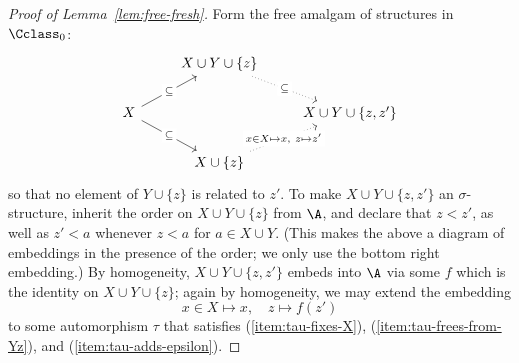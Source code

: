 \begin{proof}[Proof of Lemma~\ref{lem:free-fresh}]
    Form the free amalgam of structures in ${\Cclass}_0$:
\[\begin{tikzcd}
	& {X \cup Y \cup \{z\}} & \\
	X && {X \cup Y \cup \{z, z'\}} \\
	& {X \cup \{z\}}
	\arrow["\subseteq"{description}, dotted, from=1-2, to=2-3]
	\arrow["\subseteq"{description}, from=2-1, to=1-2]
	\arrow["\subseteq"{description}, from=2-1, to=3-2]
	\arrow["{x \in X \mapsto x,\ z \mapsto z'}"{description}, dotted, from=3-2, to=2-3]
\end{tikzcd}\]
    so that no element of $Y \cup \{z\}$ is related to $z'$.
    To make $X \cup Y \cup \{z, z'\}$ an $\sigma$-structure, 
    inherit the order on $X \cup Y \cup \{z\}$ from $\A$,
    and declare that $z < z'$, as well as $z' < a$ whenever $z<a$ for $a\in X \cup Y$. (This makes the above a diagram of embeddings in the presence of the order; we only use the bottom right embedding.)
    By homogeneity, $X \cup Y \cup \{z, z'\}$ embeds into $\A$ via some $f$ which is the identity on $X \cup Y \cup \{z\}$;
    again by homogeneity, we may extend the embedding \[ 
        x \in X \mapsto x, \quad z \mapsto f(z')
    \] to some automorphism $\tau$ that satisfies (\ref{item:tau-fixes-X}), (\ref{item:tau-frees-from-Yz}), and (\ref{item:tau-adds-epsilon}).
\end{proof}

